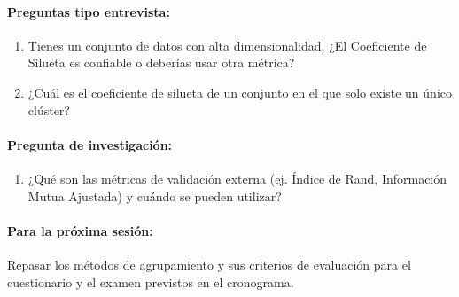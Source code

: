 \documentclass[a4,11pt]{aleph-notas}
\begin{document}
\paragraph{Preguntas tipo entrevista:} 
\begin{enumerate}[leftmargin=*]
    \item Tienes un conjunto de datos con alta dimensionalidad. ¿El Coeficiente de Silueta es confiable o deberías usar otra métrica?
    \item ¿Cuál es el coeficiente de silueta de un conjunto en el que solo existe un único clúster? 
\end{enumerate}

\paragraph{Pregunta de investigación:} 
\begin{enumerate}[leftmargin=*]
    \item ¿Qué son las métricas de validación externa (ej. Índice de Rand, Información Mutua Ajustada) y cuándo se pueden utilizar?
\end{enumerate}
    
\paragraph{Para la próxima sesión:} Repasar los métodos de agrupamiento y sus criterios de evaluación para el cuestionario y el examen previstos en el cronograma.
\end{document}
